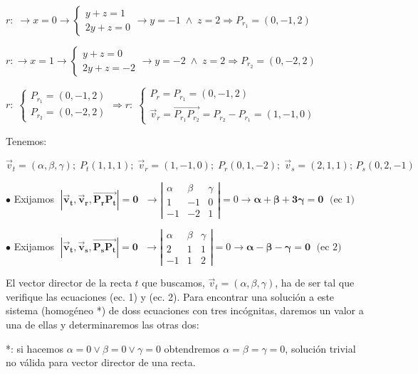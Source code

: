 $r:\; \to x=0 \to \begin{cases} y+z=1\\2y+z=0 \end{cases} \to y=-1\; \wedge \; z=2 \Rightarrow P_{r_1}=(0,-1,2)$

$r: \to x=1 \to \begin{cases} y+z=0\\2y+z=-2 \end{cases} \to y=-2\; \wedge \; z=2 \Rightarrow P_{r_2}=(0,-2,2)$

$r:\; \begin{cases} P_{r_1}=(0,-1,2) \\ P_{r_2}=(0,-2,2) \end{cases} \Rightarrow r:\; \begin{cases} P_r=P_{r_1}=(0,-1,2) \\ \vec v_r= \overrightarrow{P_{r_1} P_{r_2}}=P_{r_2}-P_{r_1}=(1,-1,0) \end{cases}$

Tenemos:

\small{\noindent $\vec v_t=(\alpha,\beta,\gamma); \; P_t(1,1,1);\; \vec v_r=(1,-1,0); \; P_r(0,1,-2); \; \vec v_s=(2,1,1); \, P_s(0,2,-1)$}

\small{\noindent $\bullet$ Exijamos $\;\boldsymbol{|\vec v_t, \vec v_r, \overrightarrow{P_rP_t}|=0}\;$ 
$\to \left| \begin{matrix} \alpha & \beta & \gamma \\ 1 &-1&0 \\ -1&-2&1 \end{matrix} \right|=0 \to \boldsymbol{\alpha+\beta+3\gamma=0}\; \text{ (ec 1)}$}


\small{\noindent $\bullet$ Exijamos $\;\boldsymbol{|\vec v_t, \vec v_s, \overrightarrow{P_sP_t}|=0}\;$
$\to \left| \begin{matrix} \alpha & \beta & \gamma \\ 2 &1&1 \\ -1&1&2 \end{matrix} \right|=0 \to \boldsymbol{\alpha-\beta-\gamma=0}\; \text{ (ec 2)}$}

\normalsize{El} vector director de la recta $t$ que buscamos, $\vec v_t=(\alpha, \beta, \gamma)$, ha de ser tal que verifique las ecuaciones (ec. 1) y (ec. 2). Para encontrar una solución a este sistema (homogéneo *) de doss ecuaciones con tres incógnitas, daremos un valor a una de ellas y determinaremos las otras dos:

\scriptsize{*: si hacemos $\alpha =0 \vee \beta=0 \vee \gamma=0$ obtendremos $\alpha=\beta=\gamma=0$, solución trivial no válida para vector director de una recta}\normalsize{.}

